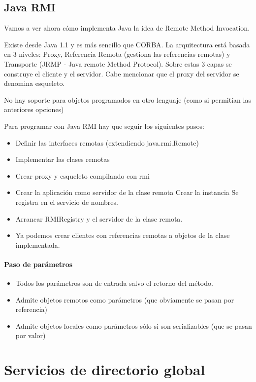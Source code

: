 \subsection{Java RMI}
Vamos a ver ahora cómo implementa Java la idea de Remote Method Invocation.

Existe desde Java 1.1 y es más sencillo que CORBA. La arquitectura está basada en 3 niveles: Proxy, Referencia Remota (gestiona las referencias remotas) y Transporte (JRMP - Java remote Method Protocol). Sobre estas 3 capas se construye el cliente y el servidor. Cabe mencionar que el proxy del servidor se denomina esqueleto.

\obs No hay soporte para objetos programados en otro lenguaje (como si permitían las anteriores opciones)

Para programar con Java RMI hay que seguir los siguientes pasos:
\begin{itemize}
	\item Definir las interfaces remotas (extendiendo java.rmi.Remote)
	\item Implementar las clases remotas

	\item Crear proxy y esqueleto compilando con rmi
	\item Crear la aplicación como servidor de la clase remota
		\subitem Crear la instancia
		\subitem Se registra en el servicio de nombres.
	\item Arrancar RMIRegistry y el servidor de la clase remota.
	\item Ya podemos crear clientes con referencias remotas a objetos de la clase implementada.
\end{itemize}

\paragraph{Paso de parámetros}
\begin{itemize}
	\item Todos los parámetros son de entrada salvo el retorno del método.
	\item Admite objetos remotos como parámetros (que obviamente se pasan por referencia)
	\item Admite objetos locales como parámetros sólo si son serializables (que se pasan por valor)
\end{itemize}

\section{Servicios de directorio global}

